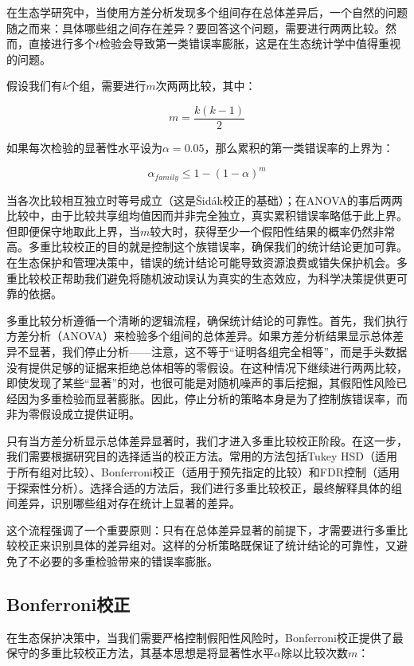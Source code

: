 \documentclass[
  twoside,12pt,fontset=none]{ctexbook}
\begin{document}
在生态学研究中，当使用方差分析发现多个组间存在总体差异后，一个自然的问题随之而来：具体哪些组之间存在差异？要回答这个问题，需要进行两两比较。然而，直接进行多个\(t\)检验会导致第一类错误率膨胀，这是在生态统计学中值得重视的问题。

假设我们有\(k\)个组，需要进行\(m\)次两两比较，其中：

\[m = \frac{k(k-1)}{2}\]

如果每次检验的显著性水平设为\(\alpha = 0.05\)，那么累积的第一类错误率的上界为：

\[\alpha_{family} \leq 1 - (1 - \alpha)^m\]

当各次比较相互独立时等号成立（这是Šidák校正的基础）；在ANOVA的事后两两比较中，由于比较共享组均值因而并非完全独立，真实累积错误率略低于此上界。但即便保守地取此上界，当\(m\)较大时，获得至少一个假阳性结果的概率仍然非常高。多重比较校正的目的就是控制这个族错误率，确保我们的统计结论更加可靠。在生态保护和管理决策中，错误的统计结论可能导致资源浪费或错失保护机会。多重比较校正帮助我们避免将随机波动误认为真实的生态效应，为科学决策提供更可靠的依据。

多重比较分析遵循一个清晰的逻辑流程，确保统计结论的可靠性。首先，我们执行方差分析（ANOVA）来检验多个组间的总体差异。如果方差分析结果显示总体差异不显著，我们停止分析------注意，这不等于``证明各组完全相等''，而是手头数据没有提供足够的证据来拒绝总体相等的零假设。在这种情况下继续进行两两比较，即使发现了某些``显著''的对，也很可能是对随机噪声的事后挖掘，其假阳性风险已经因为多重检验而显著膨胀。因此，停止分析的策略本身是为了控制族错误率，而非为零假设成立提供证明。

只有当方差分析显示总体差异显著时，我们才进入多重比较校正阶段。在这一步，我们需要根据研究目的选择适当的校正方法。常用的方法包括Tukey HSD（适用于所有组对比较）、Bonferroni校正（适用于预先指定的比较）和FDR控制（适用于探索性分析）。选择合适的方法后，我们进行多重比较校正，最终解释具体的组间差异，识别哪些组对存在统计上显著的差异。

这个流程强调了一个重要原则：只有在总体差异显著的前提下，才需要进行多重比较校正来识别具体的差异组对。这样的分析策略既保证了统计结论的可靠性，又避免了不必要的多重检验带来的错误率膨胀。

\hypertarget{bonferroniux6821ux6b63}{%
\subsection{Bonferroni校正}\label{bonferroniux6821ux6b63}}

在生态保护决策中，当我们需要严格控制假阳性风险时，Bonferroni校正提供了最保守的多重比较校正方法，其基本思想是将显著性水平\(\alpha\)除以比较次数\(m\)：
\end{document}
